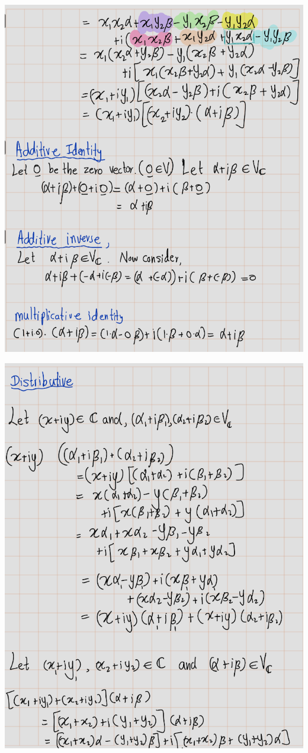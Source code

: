 \documentclass[
]{book}
\theoremstyle{definition}
\theoremstyle{definition}
\theoremstyle{definition}
\theoremstyle{definition}
\theoremstyle{remark}
\begin{document}
\includegraphics{fig/Ex1B/Ex8-3.png}

\includegraphics{fig/Ex1B/Ex8-4.png}
\end{document}
